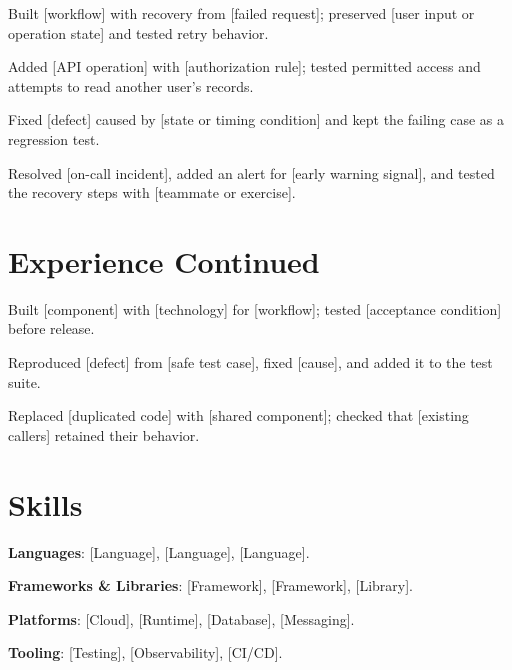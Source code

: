 \documentclass{resume}
\begin{document}
\begin{jobduties}
  \item Built [workflow] with recovery from [failed request]; preserved [user input or operation state] and tested retry behavior.
  \item Added [API operation] with [authorization rule]; tested permitted access and attempts to read another user's records.
  \item Fixed [defect] caused by [state or timing condition] and kept the failing case as a regression test.
  \item Resolved [on-call incident], added an alert for [early warning signal], and tested the recovery steps with [teammate or exercise].
\end{jobduties}

\newpage

\section{Experience Continued}

\begin{jobduties}
  \item Built [component] with [technology] for [workflow]; tested [acceptance condition] before release.
  \item Reproduced [defect] from [safe test case], fixed [cause], and added it to the test suite.
  \item Replaced [duplicated code] with [shared component]; checked that [existing callers] retained their behavior.
\end{jobduties}

\section{Skills}
\begin{skillitems}
  \item \textbf{Languages}: [Language], [Language], [Language].
  \item \textbf{Frameworks \& Libraries}: [Framework], [Framework], [Library].
  \item \textbf{Platforms}: [Cloud], [Runtime], [Database], [Messaging].
  \item \textbf{Tooling}: [Testing], [Observability], [CI/CD].
\end{skillitems}
\end{document}
